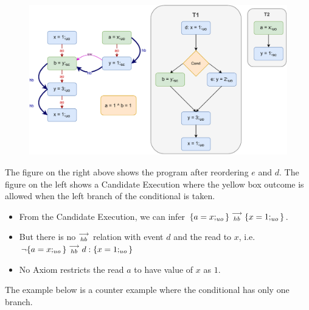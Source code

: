         \begin{figure}[H]
            \centering 
            \includegraphics[scale=0.7]{5.InstructionReordering/5.ValidReorderingProgram/CounterExamples1b(Conditionals).pdf}
            \caption{}
        \end{figure}
        The figure on the right above shows the program after reordering $e$ and $d$.  
        The figure on the left shows a Candidate Execution where the yellow box outcome is allowed when the left branch of the conditional is taken\footnotemark.


        \begin{itemize}
            \item From the Candidate Execution, we can infer $\{a=x;_{uo}\}\stackrel{\longrightarrow}{_{hb}}\{x=1;_{uo}\}$. 
            \item But there is no $\stackrel{\longrightarrow}{_{hb}}$ relation with event $d$ and the read to $x$, i.e. $\neg \{a=x;_{uo}\}\stackrel{\longrightarrow}{_{hb}}d:\{x=1;_{uo}\}$
            \item No Axiom restricts the read $a$ to have value of $x$ as $1$.
        \end{itemize}

        The example below is a counter example where the conditional has only one branch.

